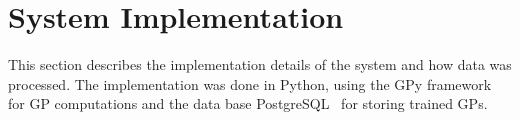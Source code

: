 
\section{System Implementation}
This section describes the implementation details of the system and
how data was processed. The implementation was done in Python, using the GPy
framework~\cite{gpy2014} for GP computations and the data base
PostgreSQL~\cite{BibEntry2019Feb} for storing trained GPs.

